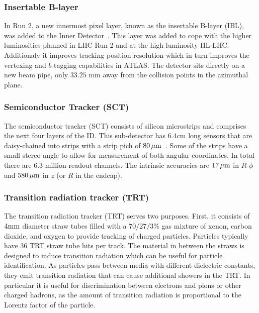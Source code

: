 \subsubsection{Insertable B-layer}

In Run 2, a new innermost pixel layer, known as the insertable B-layer (IBL), was added to the Inner Detector~\cite{IBL}. This layer was added to cope with the higher luminosities planned in LHC Run 2 and at the high luminosity HL-LHC. Additionaly it improves tracking position resolution which in turn improves the vertexing and $b$-tagging capabilities in ATLAS. The detector sits directly on a new beam pipe, only $33.25 \textrm{ mm}$ away from the collision points in the azimuthal plane. 

\subsubsection{Semiconductor Tracker (SCT)}

The semiconductor tracker (SCT) consists of silicon microstrips and comprises the next four layers of the ID. This sub-detector has $6.4 \textrm{cm}$ long sensors that are daisy-chained into strips with a strip pich of $80 \,\mu\rm m$~\cite{ATLASPaper}. Some of the strips have a small stereo angle to allow for measurement of both angular coordinates. In total there are $6.3$ million readout channels. The intrinsic accuracies are $17 \,\mu\rm m$ in $R$-$\phi$ and $580 \,\mu\rm m$ in $z$ (or $R$ in the endcap).

\subsubsection{Transition radiation tracker (TRT)}

The transition radiation tracker (TRT) serves two purposes. First, it consists of $4 \rm mm$ diameter straw tubes filled with a $70/27/3$\% gas mixture of xenon, carbon dioxide, and oxygen to provide tracking of charged particles. Particles typically have $36$ TRT straw tube hits per track. The material in between the straws is designed to induce transition radiation which can be useful for particle identification. As particles pass between media with different dielectric constants, they emit transition radiation that can cause additional showers in the TRT. In particular it is useful for discrimination between electrons and pions or other charged hadrons, as the amount of transition radiation is proportional to the Lorentz factor of the particle.

